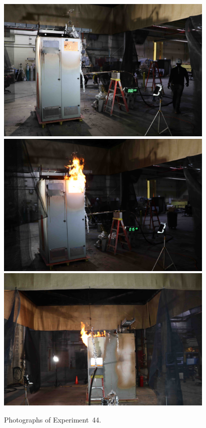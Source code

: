 \documentclass[12pt]{article}
\begin{document}
\begin{figure}[p]
\centering
\includegraphics[height=2.75in]{../FIGURES/Test_44_start} \\
\includegraphics[height=2.75in]{../FIGURES/Test_44_15_min_19_s} \\
\includegraphics[height=2.75in]{../FIGURES/Test_44_side}
\caption[Photographs of Experiment~44]{Photographs of Experiment~44.}
\label{fig:Test_44_photos}
\end{figure}


\clearpage
\end{document}
